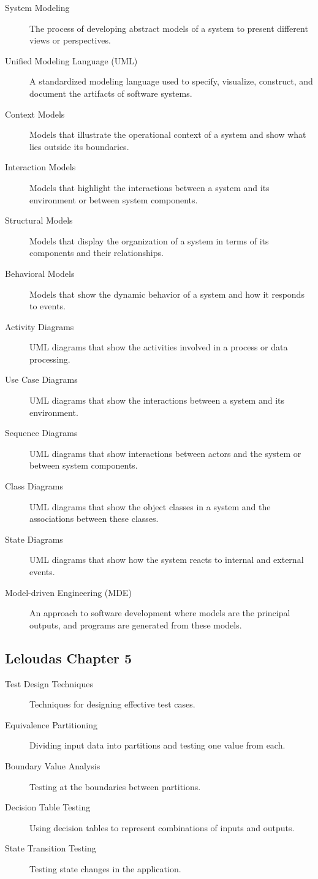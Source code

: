 \documentclass{article}
\begin{document}
\begin{description}
  \item[System Modeling] The process of developing abstract models of a system to present different views or perspectives.
  \item[Unified Modeling Language (UML)] A standardized modeling language used to specify, visualize, construct, and document the artifacts of software systems.
  \item[Context Models] Models that illustrate the operational context of a system and show what lies outside its boundaries.
  \item[Interaction Models] Models that highlight the interactions between a system and its environment or between system components.
  \item[Structural Models] Models that display the organization of a system in terms of its components and their relationships.
  \item[Behavioral Models] Models that show the dynamic behavior of a system and how it responds to events.
  \item[Activity Diagrams] UML diagrams that show the activities involved in a process or data processing.
  \item[Use Case Diagrams] UML diagrams that show the interactions between a system and its environment.
  \item[Sequence Diagrams] UML diagrams that show interactions between actors and the system or between system components.
  \item[Class Diagrams] UML diagrams that show the object classes in a system and the associations between these classes.
  \item[State Diagrams] UML diagrams that show how the system reacts to internal and external events.
  \item[Model-driven Engineering (MDE)] An approach to software development where models are the principal outputs, and programs are generated from these models.
\end{description}

\subsection{Leloudas Chapter 5}

\begin{description}
  \item[Test Design Techniques] Techniques for designing effective test cases.
  \item[Equivalence Partitioning] Dividing input data into partitions and testing one value from each.
  \item[Boundary Value Analysis] Testing at the boundaries between partitions.
  \item[Decision Table Testing] Using decision tables to represent combinations of inputs and outputs.
  \item[State Transition Testing] Testing state changes in the application.
\end{description}
\end{document}
